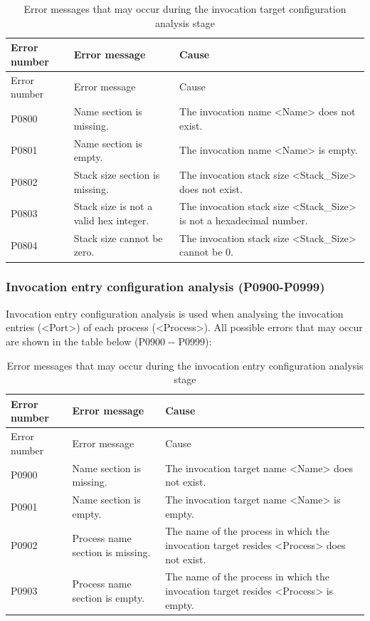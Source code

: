 \begin{xltabular}{\textwidth}{@{}>{\hsize\raggedright\arraybackslash}X>{\hsize\raggedright\arraybackslash}X>{\hsize\raggedright\arraybackslash}X@{}}
\caption{Error messages that may occur during the invocation target configuration analysis stage}\label{tab:5-11}\\
\toprule
Error number & Error message & Cause\tabularnewline
\endfirsthead
\toprule
Error number & Error message & Cause\tabularnewline
\midrule
\endhead
\bottomrule
\endlastfoot
P0800 & Name section is missing. &
The invocation name <Name> does not exist.\tabularnewline
P0801 & Name section is empty. &
The invocation name <Name> is empty.\tabularnewline
P0802 & Stack size section is missing. &
The invocation stack size <Stack\_\allowbreak{}Size> does not exist.\tabularnewline
P0803 & Stack size is not a valid hex integer. &
The invocation stack size <Stack\_\allowbreak{}Size> is not a hexadecimal number.\tabularnewline
P0804 & Stack size cannot be zero. &
The invocation stack size <Stack\_\allowbreak{}Size> cannot be 0.\tabularnewline
\end{xltabular}

\subsubsection{Invocation entry configuration analysis (P0900-P0999)}\label{subsubsec:5-6-2-10}

Invocation entry configuration analysis is used when analysing the invocation entries (<Port>) of each process (<Process>). All possible errors that may occur are shown in the table below (P0900
-\/- P0999):

\begin{xltabular}{\textwidth}{@{}>{\hsize\raggedright\arraybackslash}X>{\hsize\raggedright\arraybackslash}X>{\hsize\raggedright\arraybackslash}X@{}}
\caption{Error messages that may occur during the invocation entry configuration analysis stage}\label{tab:5-12}\\
\toprule
Error number & Error message & Cause\tabularnewline
\endfirsthead
\toprule
Error number & Error message & Cause\tabularnewline
\midrule
\endhead
\bottomrule
\endlastfoot
P0900 & Name section is missing. &
The invocation target name <Name> does not exist.\tabularnewline
P0901 & Name section is empty. &
The invocation target name <Name> is empty.\tabularnewline
P0902 & Process name section is missing. &
The name of the process in which the invocation target resides <Process> does not exist.\tabularnewline
P0903 & Process name section is empty. &
The name of the process in which the invocation target resides <Process> is empty.\tabularnewline
\end{xltabular}

